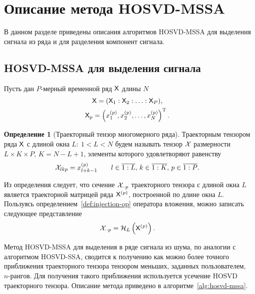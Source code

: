 \documentclass[specialist,
  substylefile=spbu_report.rtx,
subf,href,colorlinks=true, 12pt]{disser}
\theoremstyle{plain}
\theoremstyle{definition}
\newtheorem{definition}{Определение}[section]
\theoremstyle{remark}
\begin{document}
\section{Описание метода HOSVD-MSSA}\label{sec:Tensor-MSSA-method-description}
В данном разделе приведены описания алгоритмов HOSVD-MSSA для выделения сигнала из ряда и для разделения компонент сигнала.
\subsection{HOSVD-MSSA для выделения сигнала}\label{subsec:Tensor-MSSA-method-signal-description}
Пусть дан $P$-мерный временной ряд $\mathsf{X}$ длины $N$
\begin{gather*}
  \mathsf{X} = (\mathsf{X}_1: \mathsf{X}_2: \ldots: \mathsf{X}_P), \\
  \mathsf{X}_p = \left(x_1^{(p)}, x_2^{(p)}, \ldots, x_N^{(p)}\right)^{\mathrm{T}}.
\end{gather*}

\begin{definition}[Траекторный тензор многомерного ряда]
  \label{def:trajectory-tensor-mssa}
  Траекторным тензором ряда $\mathsf{X}$ с длиной окна $L:\: 1< L < N$ будем называть тензор $\mathcal{X}$
  размерности ${L \times K \times P}$, ${K = N - L + 1}$, элементы которого удовлетворяют равенству
  \[
    \mathcal{X}_{lkp}=x_{l+k-1}^{(p)} \qquad l \in \overline{1:L},\, k \in \overline{1:K},\, p \in \overline{1:P}.
  \]
\end{definition}

Из определения следует, что сечение $\mathcal{X}_{\cdot \cdot p}$ траекторного тензора с длиной окна $L$
является траекторной матрицей ряда $\mathsf{X}^{(p)}$, построенной по длине окна $L$.
Пользуясь определением~\ref{def:injection-op} оператора вложения, можно записать следующее представление
\[
  \mathcal{X}_{\cdot \cdot p} = \mathcal{H}_L \left(\mathsf{X}^{(p)}\right).
\]

Метод HOSVD-MSSA для выделения в ряде сигнала из шума, по аналогии с алгоритмом HOSVD-SSA,
сводится к получению как можно более точного приближения траекторного тензора тензором меньших,
заданных пользователем, $n$-рангов.
Для получения такого приближения используется усечение HOSVD траекторного тензора.
Описание метода приведено в алгоритме~\ref{alg:hosvd-mssa}.
\end{document}
